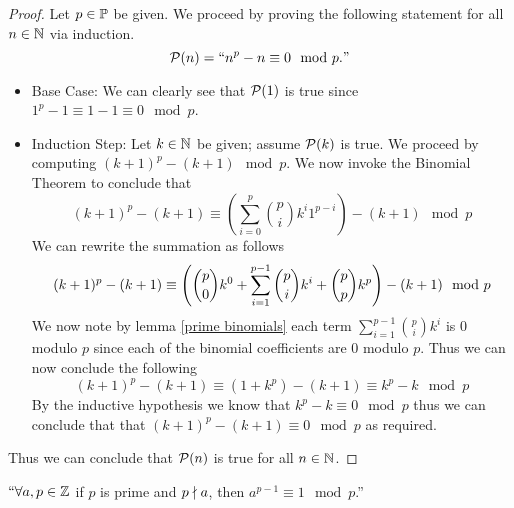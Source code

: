         \begin{proof}
            Let $p \in \mathbb{P}$ be given. We proceed by proving the following statement
            for all $n \in \mathbb{N}$ via induction.
            \[
                \mathcal{P}(n) = ``n^p - n \equiv 0 \mod p."
            \]
            \begin{itemize}
                \item
                    Base Case: We can clearly see that $\mathcal{P}(1)$ is true since
                    $1^p - 1 \equiv 1 - 1 \equiv 0 \mod p$.
                \item
                    Induction Step: Let $k \in \mathbb{N}$ be given; assume $\mathcal{P}(k)$
                    is true. We proceed by computing $(k + 1)^p - (k + 1) \mod p$. We now invoke
                    the Binomial Theorem to conclude that
                    \[
                        (k + 1)^p - (k + 1) \equiv \left(\sum_{i = 0}^p \binom{p}{i} k^i 1^{p - i}\right) - (k + 1) \mod p
                    \]
                    We can rewrite the summation as follows
                    \[
                       (k + 1)^p - (k + 1) \equiv \left(\dbinom{p}{0} k^0 + \sum_{i = 1}^{p - 1} \dbinom{p}{i}k^i + \dbinom{p}{p}k^p\right) - (k + 1) \mod p
                    \]
                    We now note by lemma \ref{prime binomials} each term $\sum_{i = 1}^{p - 1} \binom{p}{i}k^i$ 
                    is 0 modulo $p$ since each of the binomial coefficients are 0 modulo $p$. Thus
                    we can now conclude the following
                    \[
                       (k + 1)^p - (k + 1) \equiv (1 + k^p) - (k + 1) \equiv k^p - k \mod p
                    \]
                    By the inductive hypothesis we know that $k^p - k \equiv 0 \mod p$
                    thus we can conclude that that $(k + 1)^p - (k + 1) \equiv 0 \mod p$
                    as required.
            \end{itemize}
            Thus we can conclude that $\mathcal{P}(n)$ is true for all $n \in \mathbb{N}$. \QED
        \end{proof}
        \begin{theorem}
            $``\forall a, p \in \mathbb{Z}$ if $p$ is prime and $p \nmid a$, then
            $a^{p - 1} \equiv 1 \mod p$.''
            \label{Fermat's Little Theorem}
        \end{theorem}
